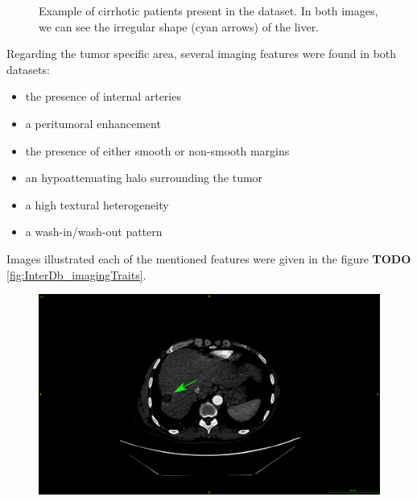{\begin{figure}[!ht]
\begin{mdframed}[backgroundcolor=blue!50,linecolor=blue!50]
\begin{minipage}{0.45\linewidth}
		\end{minipage}
	\end{mdframed}
	\caption{Example of cirrhotic patients present in the \textbf{} dataset. In both images, we can see the irregular shape (cyan arrows) of the liver.}
	\label{fig:GDb_diseasedLivers}
\end{figure}
Regarding the tumor specific area, several imaging features were found in both datasets:
\begin{itemize}
\item the presence of internal arteries
\item a peritumoral enhancement
\item the presence of either smooth or non-smooth margins
\item an hypoattenuating halo surrounding the tumor
\item a high textural heterogeneity
\item a wash-in/wash-out pattern 
\end{itemize}
Images illustrated each of the mentioned features were given in the figure \textbf{TODO} \ref{fig:InterDb_imagingTraits}.
\begin{figure}[!ht]
	\begin{mdframed}[backgroundcolor=blue!50,linecolor=blue!50]
		\centering
		\begin{minipage}{0.45\linewidth}
			\includegraphics[width=\linewidth]{images/ImagingTraits/ResizeGDB_peritumoralEnhancement}
		\end{minipage} \hspace{-0.1cm}
		\begin{minipage}{0.45\linewidth}

\end{minipage}
\end{mdframed}
\end{figure}}
